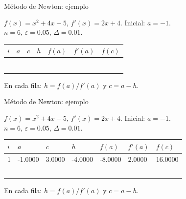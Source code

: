 \documentclass[original_version/main.tex]{subfiles}
\begin{document}
\begin{frame}[t]{Método de Newton: ejemplo}
\begin{minipage}[t][17mm]{\textwidth}\small
$f(x)=x^2+4x-5$, $f'(x)=2x+4$. Inicial: $a=-1$.\\
$n=6$, $\varepsilon=0.05$, $\Delta=0.01$.
\end{minipage}\begingroup\scriptsize\setlength{\tabcolsep}{2pt}
\begin{center}\begin{tabular}{|C{.04\textwidth}|*{6}{C{.135\textwidth}|}}\hline
$i$&$a$&$c$&$h$&$f(a)$&$f'(a)$&$f(c)$\\\hline
\rule{0pt}{5mm}&&&&&&\\\hline
\rule{0pt}{5mm}&&&&&&\\\hline
\rule{0pt}{5mm}&&&&&&\\\hline
\rule{0pt}{5mm}&&&&&&\\\hline
\rule{0pt}{5mm}&&&&&&\\\hline
\rule{0pt}{5mm}&&&&&&\\\hline
\end{tabular}\end{center}\endgroup\small En cada fila: $h=f(a)/f\prime(a)$ y $c=a-h$.
\end{frame}
\begin{frame}[t]{Método de Newton: ejemplo}
\begin{minipage}[t][17mm]{\textwidth}\small
$f(x)=x^2+4x-5$, $f'(x)=2x+4$. Inicial: $a=-1$.\\
$n=6$, $\varepsilon=0.05$, $\Delta=0.01$.
\end{minipage}\begingroup\scriptsize\setlength{\tabcolsep}{2pt}
\begin{center}\begin{tabular}{|C{.04\textwidth}|*{6}{C{.135\textwidth}|}}\hline
$i$&$a$&$c$&$h$&$f(a)$&$f'(a)$&$f(c)$\\\hline
\rule{0pt}{5mm}1&-1.0000&3.0000&-4.0000&-8.0000&2.0000&16.0000\\\hline
\rule{0pt}{5mm}&&&&&&\\\hline
\rule{0pt}{5mm}&&&&&&\\\hline
\rule{0pt}{5mm}&&&&&&\\\hline
\rule{0pt}{5mm}&&&&&&\\\hline
\rule{0pt}{5mm}&&&&&&\\\hline
\end{tabular}\end{center}\endgroup\small En cada fila: $h=f(a)/f\prime(a)$ y $c=a-h$.
\end{frame}
\end{document}
